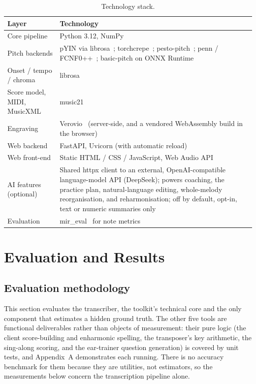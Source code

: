 \documentclass[12pt,a4paper]{article}
\begin{document}
\begin{table}[H]
\centering
\caption{Technology stack.}
\label{tab:stack}
\begin{tabular}{l p{}}
\toprule
\textbf{Layer} & \textbf{Technology} \\
\midrule
Core pipeline     & Python 3.12, NumPy \\
Pitch backends    & pYIN via librosa~\cite{librosa}; torchcrepe~\cite{crepe};
pesto-pitch~\cite{pesto}; penn / FCNF0++~\cite{penn}; basic-pitch on ONNX
Runtime~\cite{basicpitch} \\
Onset / tempo / chroma & librosa~\cite{librosa} \\
Score model, MIDI, MusicXML & music21~\cite{music21} \\
Engraving         & Verovio~\cite{verovio} (server-side, and a vendored
WebAssembly build in the browser) \\
Web backend       & FastAPI, Uvicorn (with automatic reload) \\
Web front-end     & Static HTML / CSS / JavaScript, Web Audio API \\
AI features (optional) & Shared httpx client to an external, OpenAI-compatible
language-model API (DeepSeek); powers coaching, the practice plan,
natural-language editing, whole-melody reorganisation, and reharmonisation; off
by default, opt-in, text or numeric summaries only \\
Evaluation        & mir\_eval~\cite{mireval} for note metrics \\
\bottomrule
\end{tabular}
\end{table}

\section{Evaluation and Results}

\subsection{Evaluation methodology}

This section evaluates the transcriber, the toolkit's technical core and the only
component that estimates a hidden ground truth. The other five tools are
functional deliverables rather than objects of measurement: their pure logic (the
client score-building and enharmonic spelling, the transposer's key arithmetic,
the sing-along scoring, and the ear-trainer question generation) is covered by
unit tests, and Appendix~A demonstrates each running. There is no accuracy
benchmark for them because they are utilities, not estimators, so the
measurements below concern the transcription pipeline alone.
\end{document}
